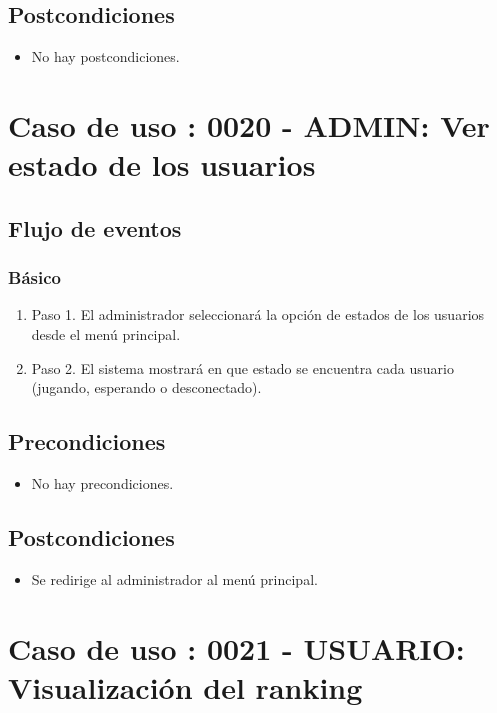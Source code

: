 \subsection{Postcondiciones}
\begin{itemize}
\item No hay postcondiciones.
\end{itemize}



\section{Caso de uso : 0020 - ADMIN: Ver estado de los usuarios}\label{sec:uc0}
\subsection{Flujo de eventos}
\subsubsection{Básico}

\begin{enumerate}
\item Paso 1.
El administrador seleccionará la opción de estados de los usuarios desde el menú principal.
\item Paso 2.
El sistema mostrará en que estado se encuentra cada usuario (jugando, esperando o desconectado).
\end{enumerate}

\subsection{Precondiciones}
\begin{itemize}
\item No hay precondiciones.
\end{itemize}

\subsection{Postcondiciones}
\begin{itemize}
\item Se redirige al administrador al menú principal.
\end{itemize}



\section{Caso de uso : 0021 - USUARIO: Visualización del ranking}\label{sec:uc0}
